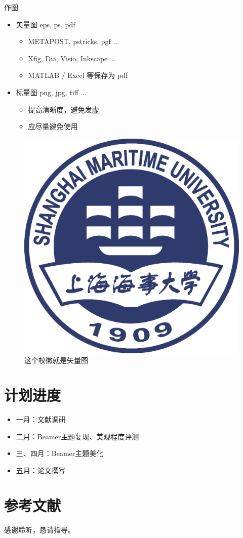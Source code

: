 \documentclass{beamer}
\begin{document}
	\begin{frame}{作图}
		\begin{itemize}
			\item 矢量图 eps, ps, pdf
			\begin{itemize}
				\item METAPOST, pstricks, pgf $\ldots$
				\item Xfig, Dia, Visio, Inkscape $\ldots$
				\item MATLAB / Excel 等保存为 pdf
			\end{itemize}
			\item 标量图 png, jpg, tiff $\ldots$
			\begin{itemize}
				\item 提高清晰度，避免发虚
				\item 应尽量避免使用
			\end{itemize}
		\end{itemize}
		\begin{figure}[htpb]
			\centering
			\includegraphics[width=0.2\linewidth]{Template/Pic/Shanghai_Maritime_University_Logo.eps}
			\caption{这个校徽就是矢量图}
		\end{figure}
	\end{frame}
	
	\section{计划进度}
	\begin{frame}
		\begin{itemize}
			\item 一月：文献调研
			\item 二月：Beamer主题复现、美观程度评测
			\item 三、四月：Beamer主题美化
			\item 五月：论文撰写
		\end{itemize}
	\end{frame}
	
	\section{参考文献}
	
	\begin{frame}[allowframebreaks]
		
		
	\end{frame}
	
	\begin{frame}
		\begin{center}
			感谢聆听，恳请指导。
		\end{center}
	\end{frame}
	
\end{document}
